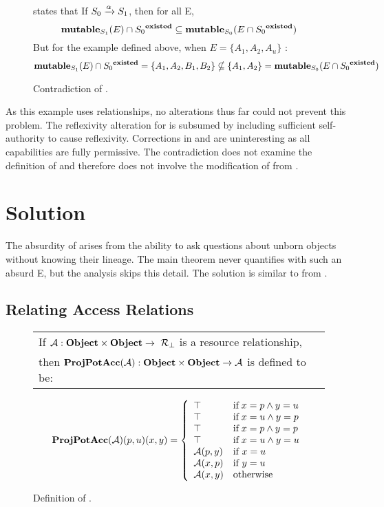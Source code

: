 \begin{figure}
\thmauthred{} states that
If \( S_0 \xrightarrow {\alpha} S_1 \), then for all E,
\[
\mathbf{mutable}_{S_1}(E) \cap {S_0}^{\mathbf{existed}} \subseteq \mathbf{mutable}_{S_0}(E \cap {S_0}^{\mathbf{existed}})
\]
But for the example defined above, when \(E = \{A_1, A_2, A_u\}\) :
\[
\mathbf{mutable}_{S_1}(E) \cap {S_0}^{\mathbf{existed}} = \{A_1,A_2,B_1,B_2\} \nsubseteq \{A_1,A_2\} = \mathbf{mutable}_{S_0}(E \cap {S_0}^{\mathbf{existed}})
\]
\caption{Contradiction of \thmauthred{}. \label{cont:SW:authred}}
\end{figure}

As this example uses \allrights{} relationships, no alterations thus far could not prevent this problem.
The reflexivity alteration for \daset{} is subsumed by including sufficient self-authority to cause reflexivity.
Corrections in \rightscpo{} and \mutable{} are uninteresting as all capabilities are fully permissive.
The contradiction does not examine the definition of \mutated{} and therefore does not involve the modification of \wroteto{} from .

\section{Solution}
\label{sec:SW:solution}

The absurdity of \thmauthred{} arises from the ability to ask questions about unborn objects without knowing their lineage.
The main theorem never quantifies \thmauthred{} with such an absurd E, but the analysis skips this detail.
The solution is similar to \TMmutableExecute{} from \TMmodelName{}.

\subsection{Relating Access Relations}

\begin{figure}
  \begin{tabular}{l}
    If \(\mathcal{A} : \mathbf{Object} \times \mathbf{Object} \rightarrow\ \mathcal{R}_{\bot} \) is a resource relationship, \\
    then \(\mathbf{ProjPotAcc}(\mathcal{A}) : \mathbf{Object} \times \mathbf{Object} \rightarrow \mathcal{A}\) is defined to be:
  \end{tabular}
\[
\mathbf{ProjPotAcc}(\mathcal{A})(p,u)(x,y) = 
\left\{
\begin{array}{ll}
  \top & \textnormal{if} \; x = p \land y = u \\
  \top & \textnormal{if} \; x = u \land y = p \\
  \top & \textnormal{if} \; x = p \land y = p \\  
  \top & \textnormal{if} \; x = u \land y = u \\
  \mathcal{A}(p,y) & \textnormal{if } x = u \\
  \mathcal{A}(x,p) & \textnormal{if } y = u \\
  \mathcal{A}(x,y) & \textnormal{otherwise}
\end{array}
\right.
\]
\caption{Definition of \ProjPotAcc{}.\label{def:SW:ProjPotAcc}}
\end{figure}



